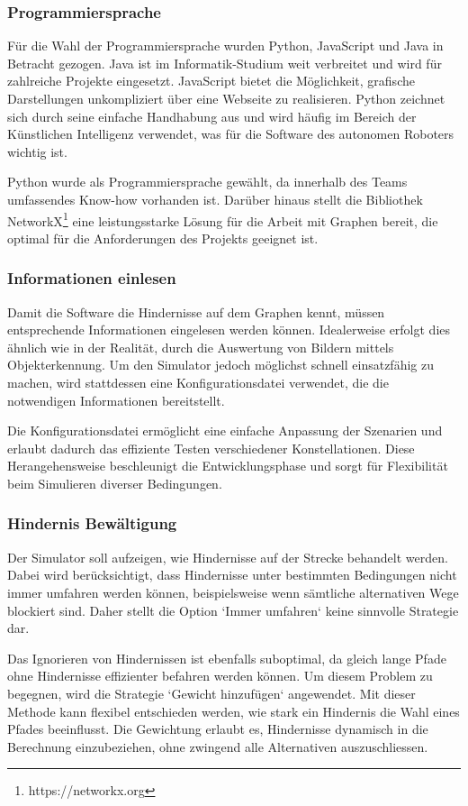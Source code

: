 \documentclass[../main.tex]{subfiles}
\begin{document}
\subsubsection{Programmiersprache}

Für die Wahl der Programmiersprache wurden Python, JavaScript und Java in Betracht gezogen. Java ist im Informatik-Studium weit verbreitet und wird für zahlreiche Projekte eingesetzt. JavaScript bietet die Möglichkeit, grafische Darstellungen unkompliziert über eine Webseite zu realisieren. Python zeichnet sich durch seine einfache Handhabung aus und wird häufig im Bereich der Künstlichen Intelligenz verwendet, was für die Software des autonomen Roboters wichtig ist.

Python wurde als Programmiersprache gewählt, da innerhalb des Teams umfassendes Know-how vorhanden ist. Darüber hinaus stellt die Bibliothek NetworkX\footnote{https://networkx.org} eine leistungsstarke Lösung für die Arbeit mit Graphen bereit, die optimal für die Anforderungen des Projekts geeignet ist.

\subsubsection{Informationen einlesen}

Damit die Software die Hindernisse auf dem Graphen kennt, müssen entsprechende Informationen eingelesen werden können. Idealerweise erfolgt dies ähnlich wie in der Realität, durch die Auswertung von Bildern mittels Objekterkennung. Um den Simulator jedoch möglichst schnell einsatzfähig zu machen, wird stattdessen eine Konfigurationsdatei verwendet, die die notwendigen Informationen bereitstellt.

Die Konfigurationsdatei ermöglicht eine einfache Anpassung der Szenarien und erlaubt dadurch das effiziente Testen verschiedener Konstellationen. Diese Herangehensweise beschleunigt die Entwicklungsphase und sorgt für Flexibilität beim Simulieren diverser Bedingungen.

\newpage
\subsubsection{Hindernis Bewältigung}

Der Simulator soll aufzeigen, wie Hindernisse auf der Strecke behandelt werden.
Dabei wird berücksichtigt, dass Hindernisse unter bestimmten Bedingungen nicht immer umfahren werden können, beispielsweise wenn sämtliche alternativen Wege blockiert sind. Daher stellt die Option `Immer umfahren` keine sinnvolle Strategie dar.

Das Ignorieren von Hindernissen ist ebenfalls suboptimal, da gleich lange Pfade ohne Hindernisse effizienter befahren werden können. Um diesem Problem zu begegnen, wird die Strategie `Gewicht hinzufügen` angewendet. Mit dieser Methode kann flexibel entschieden werden, wie stark ein Hindernis die Wahl eines Pfades beeinflusst. Die Gewichtung erlaubt es, Hindernisse dynamisch in die Berechnung einzubeziehen, ohne zwingend alle Alternativen auszuschliessen.
\end{document}
